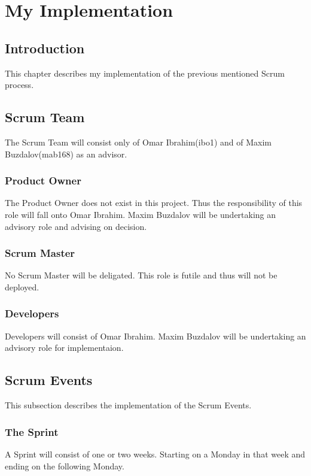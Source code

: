 \chapter{My Implementation}

\section{Introduction}
This chapter describes my implementation of the previous mentioned Scrum process.

\section{Scrum Team}
The Scrum Team will consist only of Omar Ibrahim(ibo1) and of Maxim Buzdalov(mab168) as an advisor.\newline

\subsection{Product Owner}
The Product Owner does not exist in this project. Thus the responsibility of this role will fall onto Omar Ibrahim. 
Maxim Buzdalov will be undertaking an advisory role and advising on decision.

\subsection{Scrum Master}
No Scrum Master will be deligated. This role is futile and thus will not be deployed.

\subsection{Developers}
Developers will consist of Omar Ibrahim. Maxim Buzdalov will be undertaking an advisory role for implementaion.


\section{Scrum Events}
This subsection describes the implementation of the Scrum Events.\newline

\subsection{The Sprint}
A Sprint will consist of one or two weeks. Starting on a Monday in that week and ending on the following Monday. \newline

